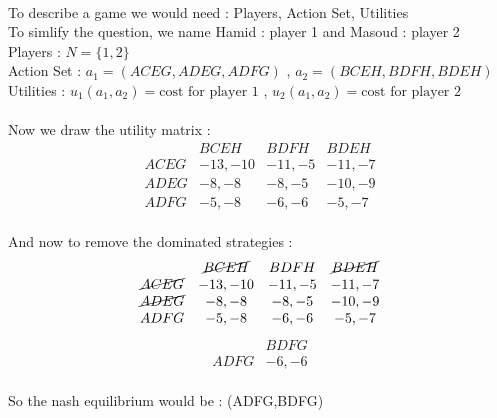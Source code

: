 \\ \noindent
\begin{latin}
    \noindent
    To describe a game we would need : Players, Action Set, Utilities \\
    To simlify the question, we name Hamid : player 1 and Masoud : player 2
    \\
    Players : $N = \{1,2\}$ \\
    Action Set : $a_1 = (ACEG,ADEG,ADFG)$ , $a_2 = (BCEH,BDFH,BDEH)$\\
    Utilities : $u_1(a_1,a_2) = \text{cost for player 1}$ , $u_2(a_1,a_2) = \text{cost for player 2}$\\
    \\ 
    Now we draw the utility matrix : \\
    \begin{equation*}
        \begin{matrix}
                & BCEH & BDFH & BDEH \\
               ACEG & -13,-10 & -11,-5  & -11,-7   \\
               ADEG & -8,-8 & -8,-5 & -10,-9  \\
               ADFG & -5,-8 & -6,-6 & -5,-7  
            \end{matrix}
        \end{equation*}
        \\ And now to remove the dominated strategies : 
        \begin{equation*}
            \begin{matrix}
                & \cancel{BCEH} & BDFH & \cancel{BDEH} \\
                \cancel{ACEG} & -13,-10 & -11,-5  & -11,-7   \\
                \cancel{ADEG} & -8,-8 & -8,-5 & -10,-9  \\
                ADFG & -5,-8 & -6,-6 & -5,-7    
                \end{matrix}
            \end{equation*}
                \begin{equation*}
                    \begin{matrix}
                            & BDFG \\
                           ADFG & -6,-6   
                        \end{matrix}
                    \end{equation*}
                    \\
                    So the nash equilibrium would be : (ADFG,BDFG) \checkmark

\end{latin}
